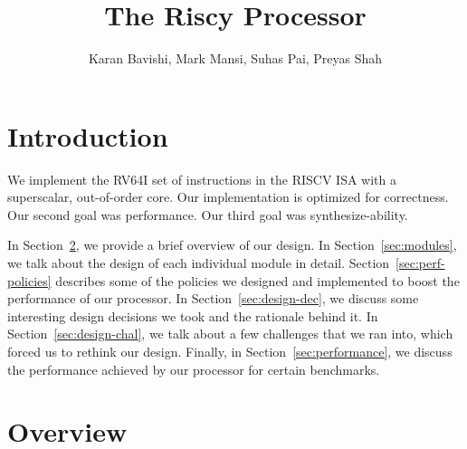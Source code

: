 \documentclass{article}
\title{The Riscy Processor}
\author{Karan Bavishi, Mark Mansi, Suhas Pai, Preyas Shah}
\begin{document}
\maketitle

\section{Introduction}

We implement the RV64I set of instructions in the RISCV ISA\cite{riscv-isa}
with a superscalar, out-of-order core. Our implementation is optimized for
correctness. Our second goal was performance.  Our third goal was
synthesize-ability. 

In Section~\ref{sec:overview}, we provide a brief overview of our design. In
Section~\ref{sec:modules}, we talk about the design of each individual module
in detail. Section~\ref{sec:perf-policies} describes some of the policies we
designed and implemented to boost the performance of our processor. In
Section~\ref{sec:design-dec}, we discuss some interesting design decisions we
took and the rationale behind it. In Section~\ref{sec:design-chal}, we talk
about a few challenges that we ran into, which forced us to rethink our design.
Finally, in Section~\ref{sec:performance}, we discuss the performance achieved
by our processor for certain benchmarks.

\section{Overview}
\label{sec:overview}
\end{document}
